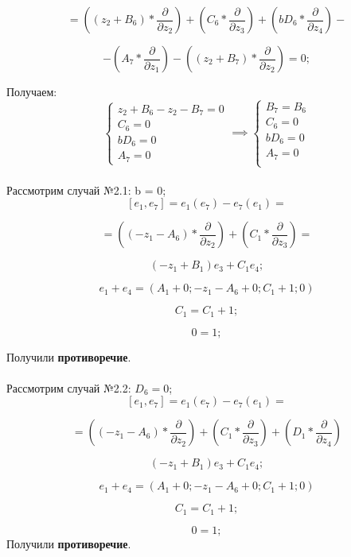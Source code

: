 \documentclass[12pt]{article}
\begin{document}
\[
= \left( (z_2 + B_6) * \frac{\partial}{\partial z_2} \right)
+ \left( C_6 * \frac{\partial}{\partial z_3} \right)
+ \left( bD_6 * \frac{\partial}{\partial z_4} \right) - 
\]

\[
- \left( A_7 * \frac{\partial}{\partial z_1} \right)
- \left( (z_2 + B_7) * \frac{\partial}{\partial z_2} \right) = 0;
\]

Получаем: \\
\[
\begin{cases}
z_2 + B_6 - z_2 - B_7 = 0 \\
C_6 = 0 \\
bD_6 = 0 \\
A_7 = 0
\end{cases}
\implies
\begin{cases}
B_7 = B_6 \\
C_6 = 0 \\
bD_6 = 0 \\
A_7 = 0 \\
\end{cases}
\]\\


Рассмотрим случай №2.1: b = 0; \\

\[
[e_1, e_7] = e_1(e_7) - e_7(e_1) = 
\]

\[
= \left( (-z_1 - A_6) * \frac{\partial}{\partial z_2} \right)
+ \left( C_1 * \frac{\partial}{\partial z_3} \right) =
\]

\[
(-z_1 + B_1)e_3 + C_1e_4;
\]

\[
e_1 + e_4 = \left(A_1 + 0; -z_1 - A_6 + 0; C_1 + 1; 0 \right)
\]

\[
C_1 = C_1 + 1;
\]

\[
0 = 1;
\]

Получили \textbf{противоречие}.\\\\
Рассмотрим случай №2.2: $D_6 = 0$; \\

\[
[e_1, e_7] = e_1(e_7) - e_7(e_1) = 
\]

\[
= \left( (-z_1 - A_6) * \frac{\partial}{\partial z_2} \right)
+ \left( C_1 * \frac{\partial}{\partial z_3} \right)
+ \left( D_1 * \frac{\partial}{\partial z_4} \right)
\]

\[
(-z_1 + B_1)e_3 + C_1e_4;
\]

\[
e_1 + e_4 = \left(A_1 + 0; -z_1 - A_6 + 0; C_1 + 1; 0 \right)
\]

\[
C_1 = C_1 + 1;
\]

\[
0 = 1;
\]
Получили \textbf{противоречие}. 
\end{document}
